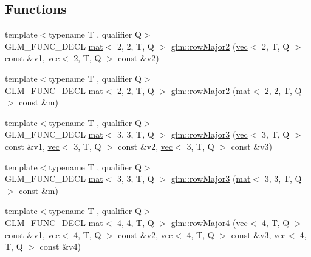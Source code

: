 \subsection*{Functions}
\begin{DoxyCompactItemize}
\item 
{\footnotesize template$<$typename T , qualifier Q$>$ }\\G\+L\+M\+\_\+\+F\+U\+N\+C\+\_\+\+D\+E\+CL \hyperlink{structglm_1_1mat}{mat}$<$ 2, 2, T, Q $>$ \hyperlink{group__gtx__matrix__major__storage_gaf5b1aee9e3eb1acf9d6c3c8be1e73bb8}{glm\+::row\+Major2} (\hyperlink{structglm_1_1vec}{vec}$<$ 2, T, Q $>$ const \&v1, \hyperlink{structglm_1_1vec}{vec}$<$ 2, T, Q $>$ const \&v2)
\item 
{\footnotesize template$<$typename T , qualifier Q$>$ }\\G\+L\+M\+\_\+\+F\+U\+N\+C\+\_\+\+D\+E\+CL \hyperlink{structglm_1_1mat}{mat}$<$ 2, 2, T, Q $>$ \hyperlink{group__gtx__matrix__major__storage_gaf66c75ed69ca9e87462550708c2c6726}{glm\+::row\+Major2} (\hyperlink{structglm_1_1mat}{mat}$<$ 2, 2, T, Q $>$ const \&m)
\item 
{\footnotesize template$<$typename T , qualifier Q$>$ }\\G\+L\+M\+\_\+\+F\+U\+N\+C\+\_\+\+D\+E\+CL \hyperlink{structglm_1_1mat}{mat}$<$ 3, 3, T, Q $>$ \hyperlink{group__gtx__matrix__major__storage_ga2ae46497493339f745754e40f438442e}{glm\+::row\+Major3} (\hyperlink{structglm_1_1vec}{vec}$<$ 3, T, Q $>$ const \&v1, \hyperlink{structglm_1_1vec}{vec}$<$ 3, T, Q $>$ const \&v2, \hyperlink{structglm_1_1vec}{vec}$<$ 3, T, Q $>$ const \&v3)
\item 
{\footnotesize template$<$typename T , qualifier Q$>$ }\\G\+L\+M\+\_\+\+F\+U\+N\+C\+\_\+\+D\+E\+CL \hyperlink{structglm_1_1mat}{mat}$<$ 3, 3, T, Q $>$ \hyperlink{group__gtx__matrix__major__storage_gad8a3a50ab47bbe8d36cdb81d90dfcf77}{glm\+::row\+Major3} (\hyperlink{structglm_1_1mat}{mat}$<$ 3, 3, T, Q $>$ const \&m)
\item 
{\footnotesize template$<$typename T , qualifier Q$>$ }\\G\+L\+M\+\_\+\+F\+U\+N\+C\+\_\+\+D\+E\+CL \hyperlink{structglm_1_1mat}{mat}$<$ 4, 4, T, Q $>$ \hyperlink{group__gtx__matrix__major__storage_ga9636cd6bbe2c32a8d0c03ffb8b1ef284}{glm\+::row\+Major4} (\hyperlink{structglm_1_1vec}{vec}$<$ 4, T, Q $>$ const \&v1, \hyperlink{structglm_1_1vec}{vec}$<$ 4, T, Q $>$ const \&v2, \hyperlink{structglm_1_1vec}{vec}$<$ 4, T, Q $>$ const \&v3, \hyperlink{structglm_1_1vec}{vec}$<$ 4, T, Q $>$ const \&v4)

\end{DoxyCompactItemize}
